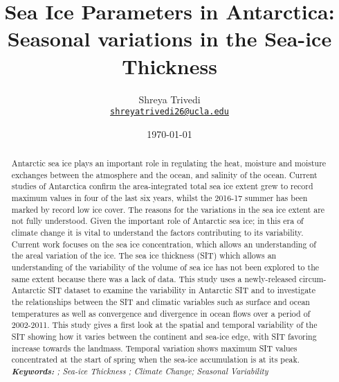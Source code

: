 \documentclass{article} %
\title{\bf Sea Ice Parameters in Antarctica: Seasonal variations in the Sea-ice Thickness}
\author{Shreya Trivedi\\%
    \href{mailto:}{\texttt{shreyatrivedi26@ucla.edu}} %
    }
\date{\today}
\begin{document}
{\setstretch
\maketitle
\begin{abstract}


Antarctic sea ice plays an important role in regulating the heat, moisture and moisture exchanges between the atmosphere and the ocean, and salinity of the ocean. Current studies of Antarctica confirm the area-integrated total sea ice extent grew to record maximum values in four of the last six years, whilst the 2016-17 summer has been marked by record low ice cover. The reasons for the variations in the sea ice extent are not fully understood. Given the important role of Antarctic sea ice; in this era of climate change it is vital to understand the factors contributing to its variability. Current work focuses on the sea ice concentration, which allows an understanding of the areal variation of the ice. The sea ice thickness (SIT) which allows an understanding of the variability of the volume of sea ice has not been explored to the same extent because there was a lack of data. This study uses a newly-released circum-Antarctic SIT dataset to examine the variability in Antarctic SIT and to investigate the relationships between the SIT and climatic variables such as surface and ocean temperatures as well as convergence and divergence in ocean flows over a period of 2002-2011. This study gives a first look at the spatial and temporal variability of the SIT showing how it varies between the continent and sea-ice edge, with SIT favoring increase towards the landmass. Temporal variation shows maximum SIT values concentrated at the start of spring when the sea-ice accumulation is at its peak.\\


\noindent
\textit{\textbf{Keywords: }%
; Sea-ice Thickness ; Climate Change; Seasonal Variability} \\ %
\noindent

\end{abstract}
}

\newpage
\tableofcontents
\listoffigures
\end{document}
